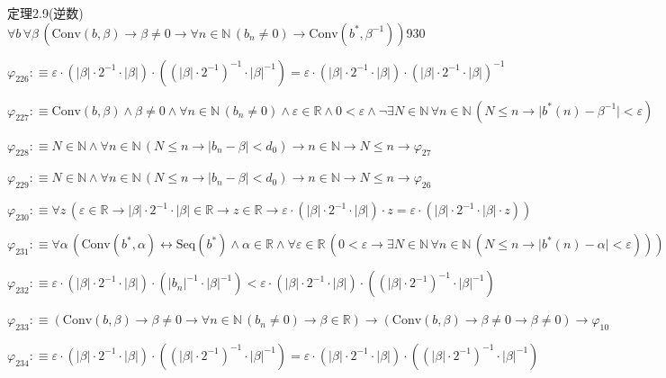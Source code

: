 \begin{fullproof}{定理2.9(逆数)}{$\forall b\,\forall \beta\,(\mathrm{Conv}(b,\beta) \to \beta \neq 0 \to \forall n \in \mathbb{N}\,(b_{n} \neq 0) \to \mathrm{Conv}(b^{\ast},\beta^{-1}))$}{930}
\begin{abbrevlist}
\item $\varphi_{226} :\equiv \varepsilon \cdot (\lvert \beta \rvert \cdot 2^{-1} \cdot \lvert \beta \rvert) \cdot ((\lvert \beta \rvert \cdot 2^{-1})^{-1} \cdot \lvert \beta \rvert^{-1}) = \varepsilon \cdot (\lvert \beta \rvert \cdot 2^{-1} \cdot \lvert \beta \rvert) \cdot (\lvert \beta \rvert \cdot 2^{-1} \cdot \lvert \beta \rvert)^{-1}$
\item $\varphi_{227} :\equiv \mathrm{Conv}(b,\beta) \land \beta \neq 0 \land \forall n \in \mathbb{N}\,(b_{n} \neq 0) \land \varepsilon \in \mathbb{R} \land 0 < \varepsilon \land \neg \exists N \in \mathbb{N}\,\forall n \in \mathbb{N}\,(N \leq n \to \lvert b^{\ast}(n) - \beta^{-1} \rvert < \varepsilon)$
\item $\varphi_{228} :\equiv N \in \mathbb{N} \land \forall n \in \mathbb{N}\,(N \leq n \to \lvert b_{n} - \beta \rvert < d_{0}) \to n \in \mathbb{N} \to N \leq n \to \varphi_{27}$
\item $\varphi_{229} :\equiv N \in \mathbb{N} \land \forall n \in \mathbb{N}\,(N \leq n \to \lvert b_{n} - \beta \rvert < d_{0}) \to n \in \mathbb{N} \to N \leq n \to \varphi_{26}$
\item $\varphi_{230} :\equiv \forall z\,(\varepsilon \in \mathbb{R} \to \lvert \beta \rvert \cdot 2^{-1} \cdot \lvert \beta \rvert \in \mathbb{R} \to z \in \mathbb{R} \to \varepsilon \cdot (\lvert \beta \rvert \cdot 2^{-1} \cdot \lvert \beta \rvert) \cdot z = \varepsilon \cdot (\lvert \beta \rvert \cdot 2^{-1} \cdot \lvert \beta \rvert \cdot z))$
\item $\varphi_{231} :\equiv \forall \alpha\,(\mathrm{Conv}(b^{\ast},\alpha) \leftrightarrow \mathrm{Seq}(b^{\ast}) \land \alpha \in \mathbb{R} \land \forall \varepsilon \in \mathbb{R}\,(0 < \varepsilon \to \exists N \in \mathbb{N}\,\forall n \in \mathbb{N}\,(N \leq n \to \lvert b^{\ast}(n) - \alpha \rvert < \varepsilon)))$
\item $\varphi_{232} :\equiv \varepsilon \cdot (\lvert \beta \rvert \cdot 2^{-1} \cdot \lvert \beta \rvert) \cdot (\lvert b_{n} \rvert^{-1} \cdot \lvert \beta \rvert^{-1}) < \varepsilon \cdot (\lvert \beta \rvert \cdot 2^{-1} \cdot \lvert \beta \rvert) \cdot ((\lvert \beta \rvert \cdot 2^{-1})^{-1} \cdot \lvert \beta \rvert^{-1})$
\item $\varphi_{233} :\equiv (\mathrm{Conv}(b,\beta) \to \beta \neq 0 \to \forall n \in \mathbb{N}\,(b_{n} \neq 0) \to \beta \in \mathbb{R}) \to (\mathrm{Conv}(b,\beta) \to \beta \neq 0 \to \beta \neq 0) \to \varphi_{10}$
\item $\varphi_{234} :\equiv \varepsilon \cdot (\lvert \beta \rvert \cdot 2^{-1} \cdot \lvert \beta \rvert) \cdot ((\lvert \beta \rvert \cdot 2^{-1})^{-1} \cdot \lvert \beta \rvert^{-1}) = \varepsilon \cdot (\lvert \beta \rvert \cdot 2^{-1} \cdot \lvert \beta \rvert) \cdot ((\lvert \beta \rvert \cdot 2^{-1})^{-1} \cdot \lvert \beta \rvert^{-1})$

\end{abbrevlist}
\end{fullproof}
